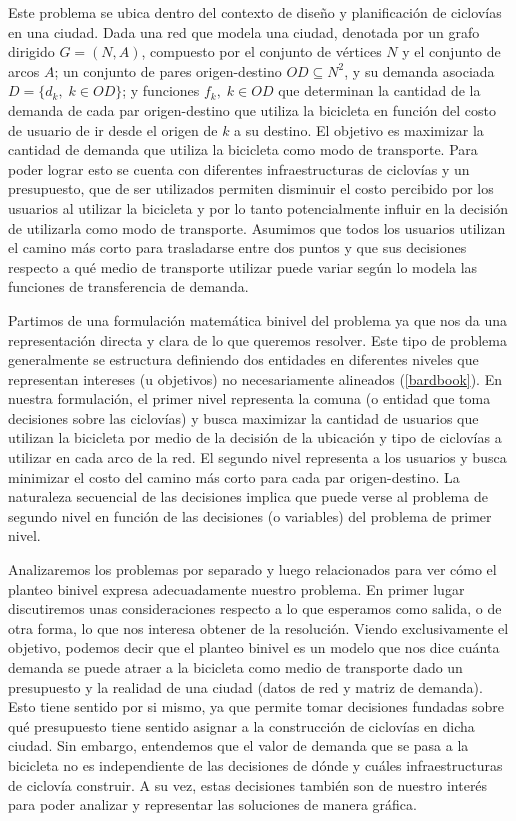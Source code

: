 \documentclass{article}
\begin{document}
  Este problema se ubica dentro del contexto de diseño y planificación de ciclovías en una ciudad. Dada una red que modela una ciudad, denotada por un grafo dirigido $G=(N,A)$, compuesto por el conjunto de vértices $N$ y el conjunto de arcos $A$; un conjunto de pares origen-destino $OD \subseteq N^2$, y su demanda asociada $D = \{d_k,\; k \in OD\}$; y funciones $f_k,\;k \in OD$ que determinan la cantidad de la demanda de cada par origen-destino que utiliza la bicicleta en función del costo de usuario de ir desde el origen de $k$ a su destino. El objetivo es maximizar la cantidad de demanda que utiliza la bicicleta como modo de transporte. Para poder lograr esto se cuenta con diferentes infraestructuras de ciclovías y un presupuesto, que de ser utilizados permiten disminuir el costo percibido por los usuarios al utilizar la bicicleta y por lo tanto potencialmente influir en la decisión de utilizarla como modo de transporte. Asumimos que todos los usuarios utilizan el camino más corto para trasladarse entre dos puntos y que sus decisiones respecto a qué medio de transporte utilizar puede variar según lo modela las funciones de transferencia de demanda.

  Partimos de una formulación matemática binivel del problema ya que nos da una representación directa y clara de lo que queremos resolver. Este tipo de problema generalmente se estructura definiendo dos entidades en diferentes niveles que representan intereses (u objetivos) no necesariamente alineados (\ref{bardbook}). En nuestra formulación, el primer nivel representa la comuna (o entidad que toma decisiones sobre las ciclovías) y busca maximizar la cantidad de usuarios que utilizan la bicicleta por medio de la decisión de la ubicación y tipo de ciclovías a utilizar en cada arco de la red. El segundo nivel representa a los usuarios y busca minimizar el costo del camino más corto para cada par origen-destino. La naturaleza secuencial de las decisiones implica que puede verse al problema de segundo nivel en función de las decisiones (o variables) del problema de primer nivel.

  Analizaremos los problemas por separado y luego relacionados para ver cómo el planteo binivel expresa adecuadamente nuestro problema. En primer lugar discutiremos unas consideraciones respecto a lo que esperamos como salida, o de otra forma, lo que nos interesa obtener de la resolución. Viendo exclusivamente el objetivo, podemos decir que el planteo binivel es un modelo que nos dice cuánta demanda se puede atraer a la bicicleta como medio de transporte dado un presupuesto y la realidad de una ciudad (datos de red y matriz de demanda). Esto tiene sentido por si mismo, ya que permite tomar decisiones fundadas sobre qué presupuesto tiene sentido asignar a la construcción de ciclovías en dicha ciudad. Sin embargo, entendemos que el valor de demanda que se pasa a la bicicleta no es independiente de las decisiones de dónde y cuáles infraestructuras de ciclovía construir. A su vez, estas decisiones también son de nuestro interés para poder analizar y representar las soluciones de manera gráfica.
\end{document}
